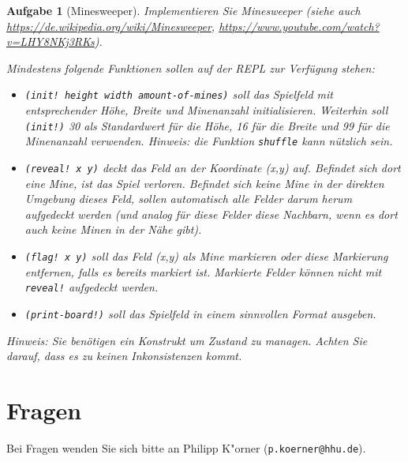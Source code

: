 \documentclass[11pt,a4paper]{article}
\newcounter{numb}
\theoremstyle{break}
\newtheorem{aufgabe}{Aufgabe}[numb]
\begin{document}
\begin{aufgabe}[Minesweeper]
Implementieren Sie Minesweeper (siehe auch \url{https://de.wikipedia.org/wiki/Minesweeper}, \url{https://www.youtube.com/watch?v=LHY8NKj3RKs}). 

Mindestens folgende Funktionen sollen auf der REPL zur Verf\"ugung stehen:

\begin{itemize}
\item \texttt{(init! height width amount-of-mines)} soll das Spielfeld mit entsprechender H\"ohe, Breite und Minenanzahl initialisieren.
Weiterhin soll \texttt{(init!)} 30 als Standardwert f\"ur die H\"ohe, 16 f\"ur die Breite und 99 f\"ur die Minenanzahl verwenden.
\emph{Hinweis:} die Funktion \verb|shuffle| kann n\"utzlich sein.
\item \texttt{(reveal! x y)} deckt das Feld an der Koordinate (x,y) auf. Befindet sich dort eine Mine, ist das Spiel verloren.
Befindet sich keine Mine in der direkten Umgebung dieses Feld, sollen automatisch alle Felder darum herum aufgedeckt werden
(und analog f\"ur diese Felder diese Nachbarn, wenn es dort auch keine Minen in der N\"ahe gibt).
\item \texttt{(flag! x y)} soll das Feld (x,y) als Mine markieren oder diese Markierung entfernen, falls es bereits markiert ist.
Markierte Felder k\"onnen nicht mit \texttt{reveal!} aufgedeckt werden.
\item \texttt{(print-board!)} soll das Spielfeld in einem sinnvollen Format ausgeben.
\end{itemize}

\emph{Hinweis:} Sie ben\"otigen ein Konstrukt um Zustand zu managen. Achten Sie darauf, dass es zu keinen Inkonsistenzen kommt.

\end{aufgabe}


\section*{Fragen}
Bei Fragen wenden Sie sich bitte an Philipp K"orner (\texttt{p.koerner@hhu.de}).
\end{document}
